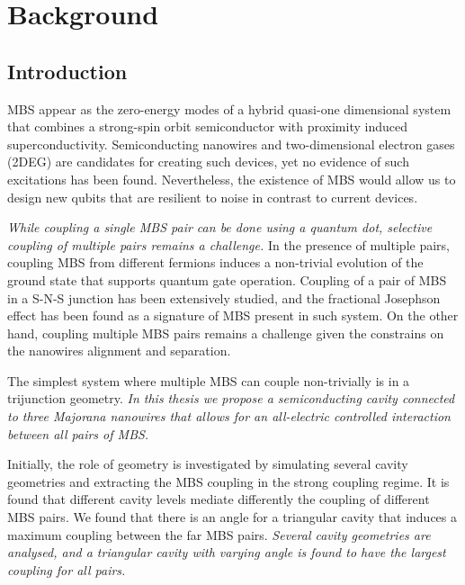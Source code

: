 \chapter{Background}

\section{Introduction}

MBS appear as the zero-energy modes of a hybrid quasi-one dimensional system that combines a strong-spin orbit semiconductor with proximity induced superconductivity.
Semiconducting nanowires and two-dimensional electron gases (2DEG) are candidates for creating such devices, yet no evidence of such excitations has been found.
Nevertheless, the existence of MBS would allow us to design new qubits that are resilient to noise in contrast to current devices.

\textit{While coupling a single MBS pair can be done using a quantum dot, selective coupling of multiple pairs remains a challenge.}
In the presence of multiple pairs, coupling MBS from different fermions induces a non-trivial evolution of the ground state that supports quantum gate operation.
Coupling of a pair of MBS in a S-N-S junction has been extensively studied, and the fractional Josephson effect has been found as a signature of MBS present in such system.
On the other hand, coupling multiple MBS pairs remains a challenge given the constrains on the nanowires alignment and separation.

The simplest system where multiple MBS can couple non-trivially is in a trijunction geometry.
\textit{In this thesis we propose a semiconducting cavity connected to three Majorana nanowires that allows for an all-electric controlled interaction between all pairs of MBS.}

Initially, the role of geometry is investigated by simulating several cavity geometries and extracting the MBS coupling in the strong coupling regime.
It is found that different cavity levels mediate differently the coupling of different MBS pairs.
We found that there is an angle for a triangular cavity that induces a maximum coupling between the far MBS pairs.
\textit{Several cavity geometries are analysed, and a triangular cavity with varying angle is found to have the largest coupling for all pairs.}

